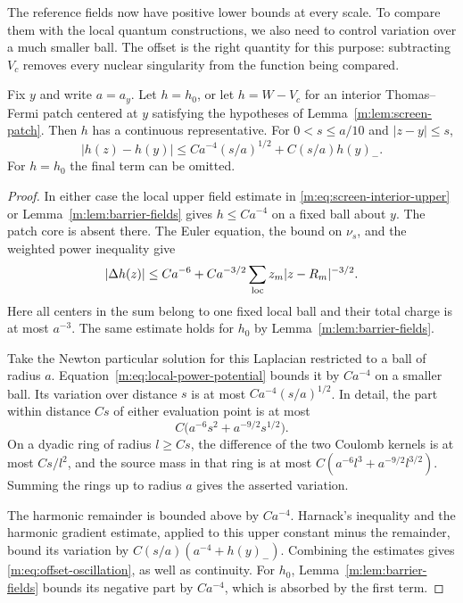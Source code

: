 The reference fields now have positive lower bounds at every scale.
To compare them with the local quantum constructions, we also need to
control variation over a much smaller ball.  The offset is the right
quantity for this purpose: subtracting $V_c$ removes every nuclear
singularity from the function being compared.

\begin{lemma}\label{m:lem:barrier-oscillation}
Fix $y$ and write $a=a_y$.  Let $h=h_0$, or let $h=W-V_c$ for an interior
Thomas--Fermi patch centered at $y$ satisfying the hypotheses of
Lemma~\ref{m:lem:screen-patch}.  Then $h$ has a continuous representative.  For
$0<s\le a/10$ and $|z-y|\le s$,
\begin{equation}\label{m:eq:offset-oscillation}
 |h(z)-h(y)|\le Ca^{-4}(s/a)^{1/2}+C(s/a)h(y)_-.
\end{equation}
For $h=h_0$ the final term can be omitted.
\end{lemma}

\begin{proof}
In either case the local upper field estimate in
\eqref{m:eq:screen-interior-upper} or Lemma~\ref{m:lem:barrier-fields}
gives $h\le Ca^{-4}$
on a fixed ball about $y$.  The patch core is absent there.  The Euler
equation, the bound on $\nu_s$, and the weighted power inequality give
\begin{equation}\label{m:eq:offset-laplacian-bound}
 |\Delta h(z)|\le Ca^{-6}
     +Ca^{-3/2}\sum_{\rm loc}z_m|z-R_m|^{-3/2}.
\end{equation}
Here all centers in the sum belong to one fixed local ball and their
total charge is at most $a^{-3}$.  The same estimate holds for $h_0$
by Lemma~\ref{m:lem:barrier-fields}.

Take the Newton particular solution for this Laplacian restricted to
a ball of radius $a$.  Equation~\eqref{m:eq:local-power-potential} bounds
it by $Ca^{-4}$ on a smaller ball.  Its variation over distance $s$
is at most $Ca^{-4}(s/a)^{1/2}$.  In detail, the part within distance
$Cs$ of either evaluation point is at most
\[
 C\bigl(a^{-6}s^2+a^{-9/2}s^{1/2}\bigr).
\]
On a dyadic ring of radius $l\ge Cs$, the difference of the two Coulomb
kernels is at most $Cs/l^2$, and the source mass in that ring is at most
$C(a^{-6}l^3+a^{-9/2}l^{3/2})$.  Summing the rings up to radius $a$
gives the asserted variation.

The harmonic remainder is bounded above by $Ca^{-4}$.  Harnack's
inequality and the harmonic gradient estimate, applied to this upper
constant minus the remainder, bound its variation by
$C(s/a)(a^{-4}+h(y)_-)$.  Combining the estimates gives
\eqref{m:eq:offset-oscillation}, as well as continuity.  For $h_0$,
Lemma~\ref{m:lem:barrier-fields} bounds its negative part by $Ca^{-4}$,
which is absorbed by the first term.
\end{proof}

